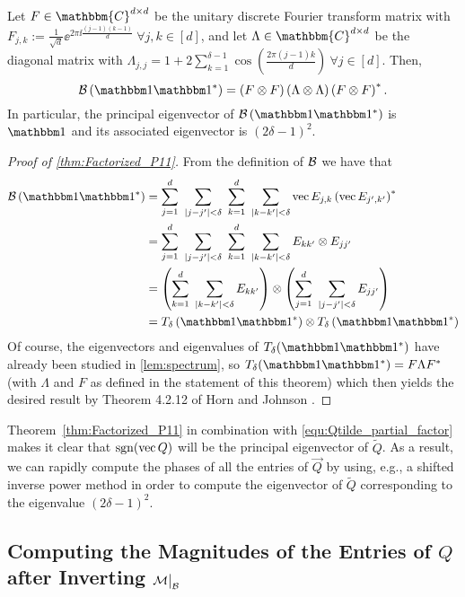 \begin{theorem}
Let $F \in \mathbbm{C}^{d \times d}$ be the unitary discrete Fourier transform matrix with $F_{j,k} := \frac{1}{\sqrt{d}} \ee^{2 \pi \ii \frac{(j-1)(k-1)}{d}} ~\forall j,k \in [d]$, and let $\Lambda \in \mathbbm{C}^{d \times d}$ be the diagonal matrix with $\Lambda_{j,j} = 1 + 2 \sum^{\delta-1}_{k=1} \cos \left( \frac{2 \pi (j-1)k}{d} \right)~\forall j \in [d]$.  Then,
$$\B \left( \one \one^* \right) = \left( F \otimes F \right) \left( \Lambda \otimes \Lambda \right) \left( F \otimes F \right)^*.$$
In particular, the principal eigenvector of $\B \left( \one \one^* \right)$ is $\one$ and its associated eigenvector is $(2 \delta - 1)^2$. 
\label{thm:Factorized_P11}
\end{theorem}

\begin{proof}[Proof of \cref{thm:Factorized_P11}]
From the definition of $\mathcal{B}$ we have that 
\begin{align*}
  \B \left( \one \one^* \right) &= \sum^d_{j=1} ~\sum_{|j - j'| < \delta} ~\sum^d_{k=1} ~\sum_{|k - k'| < \delta}\vec{E_{j,k}} \left(\vec{E_{j',k'}} \right)^* \\
  &= \sum^d_{j=1} ~\sum_{|j - j'| < \delta} ~\sum^d_{k=1} ~\sum_{|k - k'| < \delta} E_{kk'} \otimes E_{jj'} \\
  &= \left(\sum^d_{k=1} ~\sum_{|k - k'| < \delta} E_{kk'}\right) \otimes \left( \sum^d_{j=1} ~\sum_{|j - j'| < \delta} E_{jj'} \right) \\
  &= T_\delta\left(\one \one^*\right) \otimes T_\delta \left(\one \one^*\right)
\end{align*}
Of course, the eigenvectors and eigenvalues of $T_\delta(\one \one^*)$ have already been studied in \cref{lem:spectrum}, so $T_\delta(\one \one^*) = F \Lambda F^*$ (with $\Lambda$ and $F$ as defined in the statement of this theorem) which then yields the desired result by Theorem 4.2.12 of Horn and Johnson \cite{horn1991topics}.
\end{proof}

Theorem~\ref{thm:Factorized_P11} in combination with \eqref{equ:Qtilde_partial_factor} makes it clear that $\operatorname{sgn} (\operatorname{vec}{Q})$ will be the principal eigenvector of $\widetilde{Q}$.  As a result, we can rapidly compute the phases of all the entries of $\vec{Q}$ by using, e.g., a shifted inverse power method \cite{trefethen1997numerical} in order to compute the eigenvector of $\widetilde{Q}$ corresponding to the eigenvalue $(2 \delta - 1)^2$. 

\subsection{Computing the Magnitudes of the Entries of $Q$ after Inverting $\mathcal{M} \big|_{\mathcal{B}}$}
\label{sec:Getmags}

